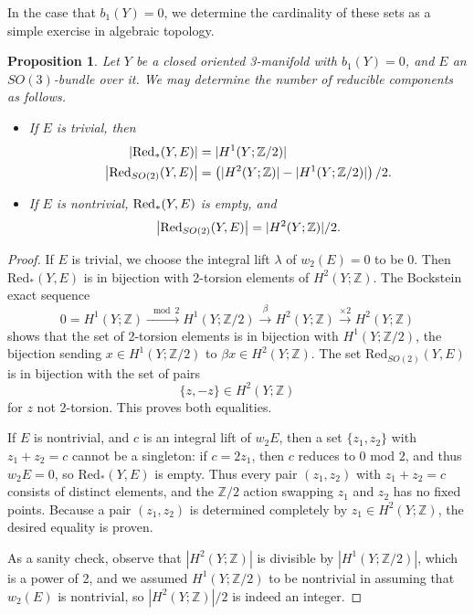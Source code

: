 \documentclass[10pt,a4paper]{amsart}
\newtheorem{proposition}[theorem]{Proposition}
\theoremstyle{definition}
\theoremstyle{remark}
\numberwithin{figure}{qchap}
\begin{document}
In the case that $b_1(Y) = 0$, we determine the cardinality of these sets as a simple exercise in algebraic topology.

\begin{proposition}\label{red-enumerate}Let $Y$ be a closed oriented 3-manifold with $b_1(Y) = 0$, and $E$ an $SO(3)$-bundle over it. We may determine the number of reducible components as follows.\begin{itemize}

\item If $E$ is trivial, then \begin{align*}|\textup{Red}_*(Y,E)| &= |H^1(Y;\mathbb Z/2)| \\ \big|\textup{Red}_{SO(2)}(Y,E)\big| &= \left(|H^2(Y;\mathbb Z)| - |H^1(Y;\mathbb Z/2)|\right)/2.\end{align*}

\item If $E$ is nontrivial, $\textup{Red}_*(Y,E)$ is empty, and $$\big|\textup{Red}_{SO(2)}(Y,E)\big| = |H^2(Y;\mathbb Z)|/2.$$
\end{itemize}\end{proposition}

\begin{proof}If $E$ is trivial, we choose the integral lift $\lambda$ of $w_2(E) = 0$ to be $0$. Then $\text{Red}_*(Y,E)$ is in bijection with 2-torsion elements of $H^2(Y;\mathbb Z)$. The Bockstein exact sequence $$0 = H^1(Y;\mathbb Z) \xrightarrow{\mod 2} H^1(Y;\mathbb Z/2) \xrightarrow{\beta} H^2(Y;\mathbb Z) \xrightarrow{\times 2} H^2(Y;\mathbb Z)$$ shows that the set of 2-torsion elements is in bijection with $H^1(Y;\mathbb Z/2)$, the bijection sending $x \in H^1(Y;\mathbb Z/2)$ to $\beta x \in H^2(Y;\mathbb Z)$. The set $\text{Red}_{SO(2)}(Y,E)$ is in bijection with the set of pairs $$\{z, -z\} \in H^2(Y;\mathbb Z)$$ for $z$ not 2-torsion. This proves both equalities.

If $E$ is nontrivial, and $c$ is an integral lift of $w_2 E$, then a set $\{z_1, z_2\}$ with $z_1 + z_2 = c$ cannot be a singleton: if $c = 2z_1$, then $c$ reduces to $0$ mod $2$, and thus $w_2 E = 0$, so $\text{Red}_*(Y,E)$ is empty. Thus every pair $(z_1, z_2)$ with $z_1 + z_2 = c$ consists of distinct elements, and the $\mathbb Z/2$ action swapping $z_1$ and $z_2$ has no fixed points. Because a pair $(z_1, z_2)$ is determined completely by $z_1 \in H^2(Y;\mathbb Z)$, the desired equality is proven.

As a sanity check, observe that $|H^2(Y;\mathbb Z)|$ is divisible by $|H^1(Y;\mathbb Z/2)|$, which is a power of 2, and we assumed $H^1(Y;\mathbb Z/2)$ to be nontrivial in assuming that $w_2(E)$ is nontrivial, so $|H^2(Y;\mathbb Z)|/2$ is indeed an integer.
\end{proof}
\end{document}
